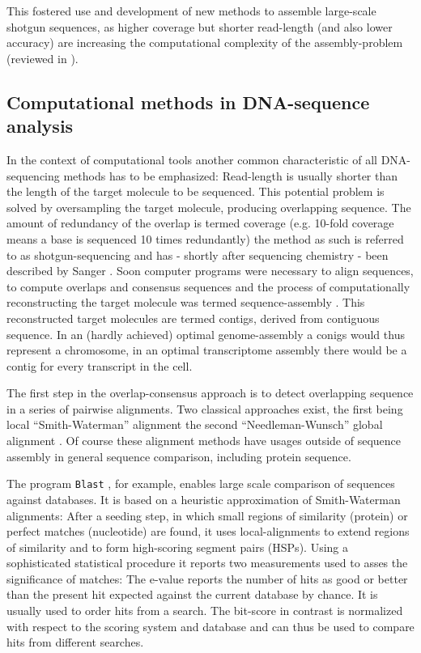 This fostered use and development of new methods to assemble
large-scale shotgun sequences, as higher coverage but shorter
read-length (and also lower accuracy) are increasing the computational
complexity of the assembly-problem (reviewed in \cite{pmid20211242}).

\subsection{Computational methods in DNA-sequence analysis}
\label{sec:comp-meth-dna}

In the context of computational tools another common characteristic of
all DNA-sequencing methods has to be emphasized: Read-length is
usually shorter than the length of the target molecule to be
sequenced. This potential problem is solved by oversampling the target
molecule, producing overlapping sequence. The amount of redundancy of
the overlap is termed coverage (e.g. 10-fold coverage means a base is
sequenced 10 times redundantly) the method as such is referred to as
shotgun-sequencing and has - shortly after sequencing chemistry - been
described by Sanger \cite{pmid6260957}. Soon computer programs were
necessary to align sequences, to compute overlaps and consensus
sequences \cite{pmid461197} and the process of computationally
reconstructing the target molecule was termed sequence-assembly
\cite{pmid6251542}. This reconstructed target molecules are termed
contigs, derived from contiguous sequence. In an (hardly achieved)
optimal genome-assembly a conigs would thus represent a chromosome, in
an optimal transcriptome assembly there would be a contig for every
transcript in the cell.

The first step in the overlap-consensus approach is to detect
overlapping sequence in a series of pairwise alignments. Two classical
approaches exist, the first being local ``Smith-Waterman'' alignment
\cite{pmid7265238} the second ``Needleman-Wunsch'' global alignment
\cite{pmid7334527}. Of course these alignment methods have usages
outside of sequence assembly in general sequence comparison, including
protein sequence.

The program \texttt{Blast} \cite{pmid2231712}, for example, enables
large scale comparison of sequences against databases. It is based on
a heuristic approximation of Smith-Waterman alignments: After a
seeding step, in which small regions of similarity (protein) or
perfect matches (nucleotide) are found, it uses local-alignments to
extend regions of similarity and to form high-scoring segment pairs
(HSPs). Using a sophisticated statistical procedure it reports two
measurements used to asses the significance of matches: The e-value
reports the number of hits as good or better than the present hit
expected against the current database by chance. It is usually used to
order hits from a search. The bit-score in contrast is normalized with
respect to the scoring system and database and can thus be used to
compare hits from different searches.

